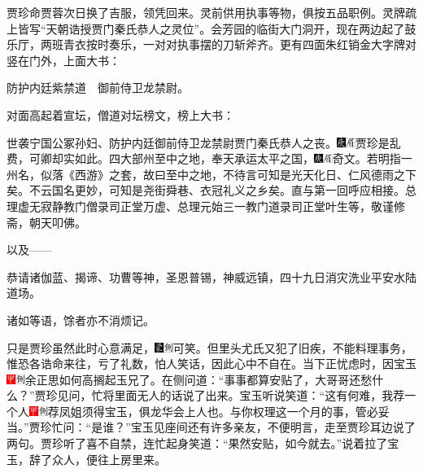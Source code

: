 贾珍命贾蓉次日换了吉服，领凭回来。灵前供用执事等物，俱按五品职例。灵牌疏上皆写“天朝诰授贾门秦氏恭人之灵位”。会芳园的临街大门洞开，现在两边起了鼓乐厅，两班青衣按时奏乐，一对对执事摆的刀斩斧齐。更有四面朱红销金大字牌对竖在门外，上面大书：

防护内廷紫禁道　御前侍卫龙禁尉。

对面高起着宣坛，僧道对坛榜文，榜上大书：

世袭宁国公冢孙妇、防护内廷御前侍卫龙禁尉贾门秦氏恭人之丧。{\includegraphics[width=3mm]{../Images/00004}\includegraphics[width=3mm]{../Images/00010}\footnotesize \kaishu 贾珍是乱费，可卿却实如此。}四大部州至中之地，奉天承运太平之国，{\includegraphics[width=3mm]{../Images/00004}\includegraphics[width=3mm]{../Images/00010}\footnotesize \kaishu 奇文。若明指一州名，似落《西游》之套，故曰至中之地，不待言可知是光天化日、仁风德雨之下矣。不云国名更妙，可知是尧街舜巷、衣冠礼义之乡矣。直与第一回呼应相接。}总理虚无寂静教门僧录司正堂万虚、总理元始三一教门道录司正堂叶生等，敬谨修斋，朝天叩佛。

以及------

恭请诸伽蓝、揭谛、功曹等神，圣恩普锡，神威远镇，四十九日消灾洗业平安水陆道场。

诸如等语，馀者亦不消烦记。

只是贾珍虽然此时心意满足，{\includegraphics[width=3mm]{../Images/00006}\includegraphics[width=3mm]{../Images/00011}\footnotesize \kaishu 可笑。}但里头尤氏又犯了旧疾，不能料理事务，惟恐各诰命来往，亏了礼数，怕人笑话，因此心中不自在。当下正忧虑时，因宝玉{\includegraphics[width=3mm]{../Images/00002}\includegraphics[width=3mm]{../Images/00011}\footnotesize \kaishu 余正思如何高搁起玉兄了。}在侧问道：“事事都算安贴了，大哥哥还愁什么？”贾珍见问，忙将里面无人的话说了出来。宝玉听说笑道：“这有何难，我荐一个人{\includegraphics[width=3mm]{../Images/00002}\includegraphics[width=3mm]{../Images/00011}\footnotesize \kaishu 荐凤姐须得宝玉，俱龙华会上人也。}与你权理这一个月的事，管必妥当。”贾珍忙问：“是谁？”宝玉见座间还有许多亲友，不便明言，走至贾珍耳边说了两句。贾珍听了喜不自禁，连忙起身笑道：“果然安贴，如今就去。”说着拉了宝玉，辞了众人，便往上房里来。

